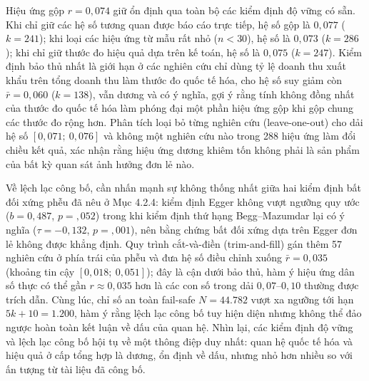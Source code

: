 \documentclass[
  a4paper,
  13pt]{extreport}
\begin{document}
Hiệu ứng gộp \(r = 0{,}074\) giữ ổn định qua toàn bộ các kiểm định độ
vững có sẵn. Khi chỉ giữ các hệ số tương quan được báo cáo trực tiếp, hệ
số gộp là \(0{,}077\) (\(k = 241\)); khi loại các hiệu ứng từ mẫu rất
nhỏ (\(n < 30\)), hệ số là \(0{,}073\) (\(k = 286\)); khi chỉ giữ thước
đo hiệu quả dựa trên kế toán, hệ số là \(0{,}075\) (\(k = 247\)). Kiểm
định bảo thủ nhất là giới hạn ở các nghiên cứu chỉ dùng tỷ lệ doanh thu
xuất khẩu trên tổng doanh thu làm thước đo quốc tế hóa, cho hệ số suy
giảm còn \(\bar{r} = 0{,}060\) (\(k = 138\)), vẫn dương và có ý nghĩa,
gợi ý rằng tính không đồng nhất của thước đo quốc tế hóa làm phóng đại
một phần hiệu ứng gộp khi gộp chung các thước đo rộng hơn. Phân tích
loại bỏ từng nghiên cứu (leave-one-out) cho dải hệ số
\([0{,}071;\ 0{,}076]\) và không một nghiên cứu nào trong 288 hiệu ứng
làm đổi chiều kết quả, xác nhận rằng hiệu ứng dương khiêm tốn không phải
là sản phẩm của bất kỳ quan sát ảnh hưởng đơn lẻ nào.

Về lệch lạc công bố, cần nhấn mạnh sự không thống nhất giữa hai kiểm
định bất đối xứng phễu đã nêu ở Mục 4.2.4: kiểm định Egger không vượt
ngưỡng quy ước (\(b = 0{,}487\), \(p = {,}052\)) trong khi kiểm định thứ
hạng Begg--Mazumdar lại có ý nghĩa (\(\tau = -0{,}132\),
\(p = {,}001\)), nên bằng chứng bất đối xứng dựa trên Egger đơn lẻ không
được khẳng định. Quy trình cắt-và-điền (trim-and-fill) gán thêm 57
nghiên cứu ở phía trái của phễu và đưa hệ số điều chỉnh xuống
\(\bar{r} = 0{,}035\) (khoảng tin cậy \([0{,}018;\ 0{,}051]\)); đây là
cận dưới bảo thủ, hàm ý hiệu ứng dân số thực có thể gần
\(r \approx 0{,}035\) hơn là các con số trong dải \(0{,}07\)--\(0{,}10\)
thường được trích dẫn. Cùng lúc, chỉ số an toàn fail-safe \(N = 44.782\)
vượt xa ngưỡng tới hạn \(5k + 10 = 1.200\), hàm ý rằng lệch lạc công bố
tuy hiện diện nhưng không thể đảo ngược hoàn toàn kết luận về dấu của
quan hệ. Nhìn lại, các kiểm định độ vững và lệch lạc công bố hội tụ về
một thông điệp duy nhất: quan hệ quốc tế hóa và hiệu quả ở cấp tổng hợp
là dương, ổn định về dấu, nhưng nhỏ hơn nhiều so với ấn tượng từ tài
liệu đã công bố.
\end{document}
